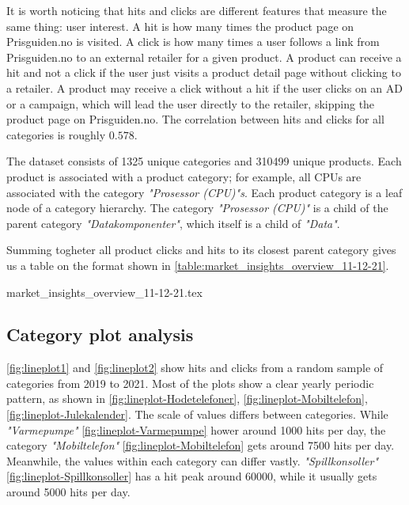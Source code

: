 It is worth noticing that hits and clicks are different features that measure the same thing: user interest.
A hit is how many times the product page on Prisguiden.no is visited.
A click is how many times a user follows a link from Prisguiden.no to an external retailer for a given product.
A product can receive a hit and not a click if the user just visits a product detail page without clicking to a retailer.
A product may receive a click without a hit if the user clicks on an AD or a campaign, which will lead the user directly to the retailer,
skipping the product page on Prisguiden.no.
The correlation between hits and clicks for all categories is roughly $0.578$.

The dataset consists of 1325 unique categories and 310499 unique products.
Each product is associated with a product category; for example,
all CPUs are associated with the category
\textit{"Prosessor (CPU)"s}.
Each product category is a leaf node of a category hierarchy.
The category \textit{"Prosessor (CPU)"} is a child of the parent category
\textit{"Datakomponenter"}, which itself is a child of \textit{"Data"}.

Summing togheter all product clicks and hits to its closest parent category
gives us a table on the format shown in \autoref{table:market_insights_overview_11-12-21}.

{market_insights_overview_11-12-21.tex}

\subsection{Category plot analysis}
\autoref{fig:lineplot1} and \autoref{fig:lineplot2} show hits and clicks
from a random sample of categories from 2019 to 2021.
Most of the plots show a clear yearly periodic pattern, as shown in
\autoref{fig:lineplot-Hodetelefoner},
\autoref{fig:lineplot-Mobiltelefon},
\autoref{fig:lineplot-Julekalender}.
The scale of values differs between categories.
While \textit{"Varmepumpe"} \autoref{fig:lineplot-Varmepumpe} hower around 1000 hits per day,
the category \textit{"Mobiltelefon"} \autoref{fig:lineplot-Mobiltelefon} gets around 7500 hits per day.
Meanwhile, the values within each category can differ vastly.
\textit{"Spillkonsoller"} \autoref{fig:lineplot-Spillkonsoller} has a hit peak around 60000,
while it usually gets around 5000 hits per day.

